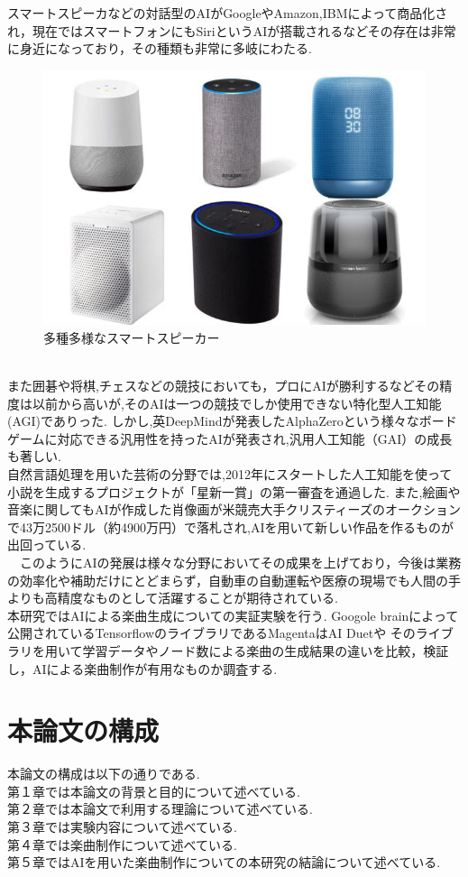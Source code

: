 スマートスピーカなどの対話型のAIがGoogleやAmazon,IBMによって商品化され，現在ではスマートフォンにもSiriというAIが搭載されるなどその存在は非常に身近になっており，その種類も非常に多岐にわたる.
\begin{figure}[h]
    \begin{screen}
    \begin{center}
        \includegraphics[scale=0.6, clip]{./img/smartspeaker_list.jpg}
        \caption{多種多様なスマートスピーカー}
        \label{fig:多種多様なスマートスピーカー}
    \end{center}
\end{screen}
\end{figure}\\
また囲碁や将棋,チェスなどの競技においても，プロにAIが勝利するなどその精度は以前から高いが,そのAIは一つの競技でしか使用できない特化型人工知能(AGI)でありった.
しかし,英DeepMindが発表したAlphaZeroという様々なボードゲームに対応できる汎用性を持ったAIが発表され,汎用人工知能（GAI）の成長も著しい.\\
自然言語処理を用いた芸術の分野では,2012年にスタートした人工知能を使って小説を生成するプロジェクトが「星新一賞」の第一審査を通過した.
また,絵画や音楽に関してもAIが作成した肖像画が米競売大手クリスティーズのオークションで43万2500ドル（約4900万円）で落札され,AIを用いて新しい作品を作るものが出回っている.\\
　このようにAIの発展は様々な分野においてその成果を上げており，今後は業務の効率化や補助だけにとどまらず，自動車の自動運転や医療の現場でも人間の手よりも高精度なものとして活躍することが期待されている.\\
本研究ではAIによる楽曲生成についての実証実験を行う.
Googole brainによって公開されているTensorflowのライブラリであるMagentaはAI Duetや
そのライブラリを用いて学習データやノード数による楽曲の生成結果の違いを比較，検証し，AIによる楽曲制作が有用なものか調査する.\\
\section{本論文の構成}
本論文の構成は以下の通りである.\\
第１章では本論文の背景と目的について述べている.\\
第２章では本論文で利用する理論について述べている.\\
第３章では実験内容について述べている.\\
第４章では楽曲制作について述べている.\\
第５章ではAIを用いた楽曲制作についての本研究の結論について述べている.\\